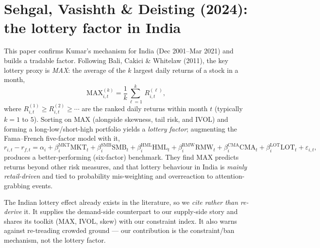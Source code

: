 \section{Sehgal, Vasishth \& Deisting (2024): the lottery factor in India}
\label{sec:lottery-india}
This paper confirms Kumar's mechanism for India (Dec 2001--Mar 2021) and builds a tradable factor. Following Bali, Cakici \& Whitelaw (2011), the key lottery proxy is \emph{MAX}: the average of the $k$ largest daily returns of a stock in a month,
\begin{equation}
\mathrm{MAX}^{(k)}_{i,t} = \frac{1}{k}\sum_{\ell=1}^{k}\,R^{(\ell)}_{i,t}, \label{eq:max}
\end{equation}
where $R^{(1)}_{i,t}\ge R^{(2)}_{i,t}\ge\cdots$ are the ranked daily returns within month $t$ (typically $k=1$ to $5$). Sorting on MAX (alongside skewness, tail risk, and IVOL) and forming a long-low/short-high portfolio yields a \emph{lottery factor}; augmenting the Fama--French five-factor model with it,
\begin{equation}
r_{i,t}-r_{f,t} = \alpha_i + \beta_i^{\text{MKT}}\mathrm{MKT}_t + \beta_i^{\text{SMB}}\mathrm{SMB}_t + \beta_i^{\text{HML}}\mathrm{HML}_t + \beta_i^{\text{RMW}}\mathrm{RMW}_t + \beta_i^{\text{CMA}}\mathrm{CMA}_t + \beta_i^{\text{LOT}}\mathrm{LOT}_t + \varepsilon_{i,t}, \label{eq:ff6}
\end{equation}
produces a better-performing (six-factor) benchmark. They find MAX predicts returns beyond other risk measures, and that lottery behaviour in India is \emph{mainly retail-driven} and tied to probability mis-weighting and overreaction to attention-grabbing events.

\begin{takeaway}
The Indian lottery effect already exists in the literature, so we \emph{cite rather than re-derive} it. It supplies the demand-side counterpart to our supply-side story and shares its toolkit (MAX, IVOL, skew) with our constraint index. It also warns against re-treading crowded ground --- our contribution is the constraint/ban mechanism, not the lottery factor.
\end{takeaway}

